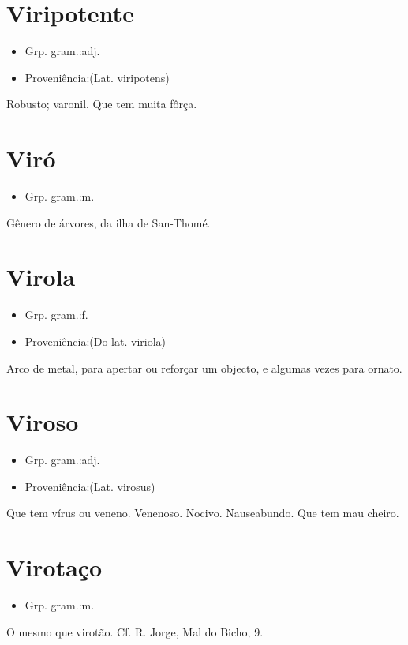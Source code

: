 \documentclass{article}
\begin{document}
\section{Viripotente}
\begin{itemize}
\item {Grp. gram.:adj.}
\end{itemize}
\begin{itemize}
\item {Proveniência:(Lat. \textunderscore viripotens\textunderscore )}
\end{itemize}
Robusto; varonil.
Que tem muita fôrça.
\section{Viró}
\begin{itemize}
\item {Grp. gram.:m.}
\end{itemize}
Gênero de árvores, da ilha de San-Thomé.
\section{Virola}
\begin{itemize}
\item {Grp. gram.:f.}
\end{itemize}
\begin{itemize}
\item {Proveniência:(Do lat. \textunderscore viriola\textunderscore )}
\end{itemize}
Arco de metal, para apertar ou reforçar um objecto, e algumas vezes para ornato.
\section{Viroso}
\begin{itemize}
\item {Grp. gram.:adj.}
\end{itemize}
\begin{itemize}
\item {Proveniência:(Lat. \textunderscore virosus\textunderscore )}
\end{itemize}
Que tem vírus ou veneno.
Venenoso.
Nocivo.
Nauseabundo.
Que tem mau cheiro.
\section{Virotaço}
\begin{itemize}
\item {Grp. gram.:m.}
\end{itemize}
O mesmo que \textunderscore virotão\textunderscore . Cf. R. Jorge, \textunderscore Mal do Bicho\textunderscore , 9.
\end{document}
